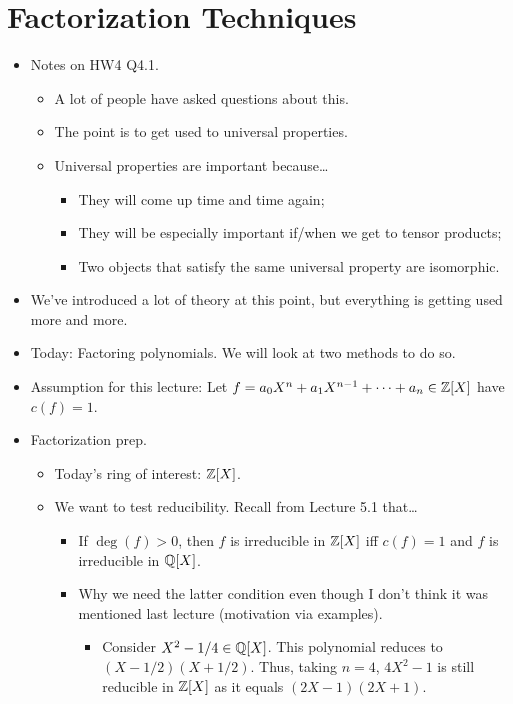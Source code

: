 \documentclass[../notes.tex]{subfiles}
\begin{document}
\section{Factorization Techniques}
\begin{itemize}
    \item {}Notes on HW4 Q4.1.
    \begin{itemize}
        \item A lot of people have asked questions about this.
        \item The point is to get used to universal properties.
        \item Universal properties are important because\dots
        \begin{itemize}
            \item They will come up time and time again;
            \item They will be especially important if/when we get to tensor products;
            \item Two objects that satisfy the same universal property are isomorphic.
        \end{itemize}
    \end{itemize}
    \item We've introduced a lot of theory at this point, but everything is getting used more and more.
    \item Today: Factoring polynomials. We will look at two methods to do so.
    \item Assumption for this lecture: Let $f=a_0X^n+a_1X^{n-1}+\cdots+a_n\in\mathbb{Z}[X]$ have $c(f)=1$.
    \item Factorization prep.
    \begin{itemize}
        \item Today's ring of interest: $\mathbb{Z}[X]$.
        \item We want to test reducibility. Recall from Lecture 5.1 that\dots
        \begin{itemize}
            \item If $\deg(f)>0$, then $f$ is irreducible in $\mathbb{Z}[X]$ iff $c(f)=1$ and $f$ is irreducible in $\mathbb{Q}[X]$.
            \item Why we need the latter condition even though I don't think it was mentioned last lecture (motivation via examples).
            \begin{itemize}
                \item Consider $X^2-1/4\in\mathbb{Q}[X]$. This polynomial reduces to $(X-1/2)(X+1/2)$. Thus, taking $n=4$, $4X^2-1$ is still reducible in $\mathbb{Z}[X]$ as it equals $(2X-1)(2X+1)$.

\end{itemize}
\end{itemize}
\end{itemize}
\end{itemize}
\end{document}
